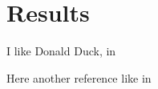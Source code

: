 \section{Results}

I like Donald Duck, in \cite{leal2018web}

Here another reference like in \cite*{leal2018web}
